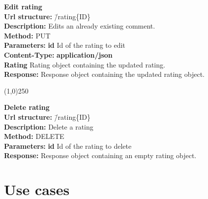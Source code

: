 \documentclass[11pt]{article}
\begin{document}
\begin{tabbing}
\textbf{Edit rating} \\
\textcolor{black!60}{\textbf{Url structure:}} \hspace{0.2in} \= /rating\{ID\} \\
\textcolor{black!60}{\textbf{Description:}}  \> Edits an already existing comment. \\
\textcolor{black!60}{\textbf{Method:}} \> PUT \\
\textcolor{black!60}{\textbf{Parameters:}} \> \textbf{id} Id of the rating to edit \\
\textcolor{black!60}{\textbf{Content-Type:}} \> \textbf{application/json} \\
\> \textbf{Rating} Rating object containing the updated rating. \\
\textcolor{black!60}{\textbf{Response:}} \> Response object containing the updated rating object.
\end{tabbing}

\begin{center}\line(1,0){250}\end{center}

\begin{tabbing}
\textbf{Delete rating} \\
\textcolor{black!60}{\textbf{Url structure:}} \hspace{0.2in} \= /rating\{ID\} \\
\textcolor{black!60}{\textbf{Description:}}  \> Delete a rating \\
\textcolor{black!60}{\textbf{Method:}} \> DELETE \\
\textcolor{black!60}{\textbf{Parameters:}} \> \textbf{id} Id of the rating to delete \\
\textcolor{black!60}{\textbf{Response:}} \> Response object containing an empty rating object.
\end{tabbing}

\section{Use cases}
\end{document}
